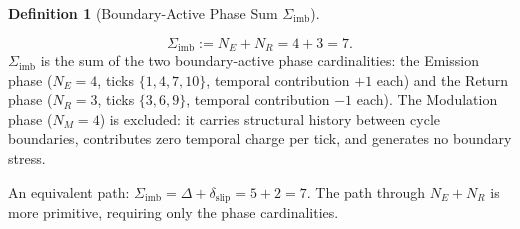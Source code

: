 \documentclass[11pt, letterpaper]{article}
\newcommand{\Sigimb}{\Sigma_{\mathrm{imb}}}
\theoremstyle{definition}
\newtheorem{definition}{Definition}[section]
\theoremstyle{plain}
\begin{document}
\begin{definition}[Boundary-Active Phase Sum $\Sigimb$]\label{def:sigimb}
\begin{rsbox}
\[
\Sigimb := N_E + N_R = 4 + 3 = 7.
\]
$\Sigimb$ is the sum of the two boundary-active phase cardinalities: the
Emission phase ($N_E=4$, ticks $\{1,4,7,10\}$, temporal contribution $+1$
each) and the Return phase ($N_R=3$, ticks $\{3,6,9\}$, temporal
contribution $-1$ each).  The Modulation phase ($N_M=4$) is excluded: it
carries structural history between cycle boundaries, contributes zero temporal
charge per tick, and generates no boundary stress.

An equivalent path: $\Sigimb=\Delta+\delta_{\mathrm{slip}}=5+2=7$.  The path
through $N_E+N_R$ is more primitive, requiring only the phase cardinalities.
\end{rsbox}
\end{definition}
\end{document}
